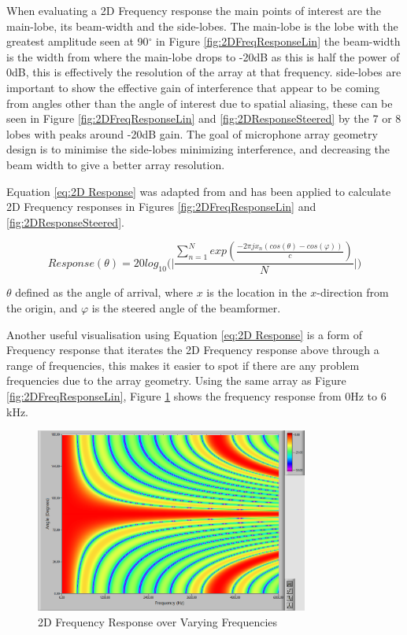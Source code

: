 \documentclass{UoNMCHA}
\numberwithin{equation}{section}
\begin{document}
    When evaluating a 2D Frequency response the main points of interest are the main-lobe, its beam-width and the side-lobes. The main-lobe is the lobe with the greatest amplitude seen at 90$^{\circ}$ in Figure \ref{fig:2DFreqResponseLin} the beam-width is the width from where the main-lobe drops to -20dB as this is half the power of 0dB, this is effectively the resolution of the array at that frequency. side-lobes are important to show the effective gain of interference that appear to be coming from angles other than the angle of interest due to spatial aliasing, these can be seen in Figure \ref{fig:2DFreqResponseLin} and \ref{fig:2DResponseSteered} by the 7 or 8 lobes with peaks around -20dB gain. The goal of microphone array geometry design is to minimise the side-lobes minimizing interference, and decreasing the beam width to give a better array resolution.
    
    Equation \ref{eq:2D Response} was adapted from \citet{Ben08} and has been applied to calculate 2D Frequency responses in Figures \ref{fig:2DFreqResponseLin} and \ref{fig:2DResponseSteered}.
    
    \begin{equation}
        Response(\theta) = 20log_{10} \Big( \Big|\frac{\sum_{n=1}^N exp(\frac{-2\pi jx_n(cos(\theta)-cos(\varphi))}{c})}{N}\Big| \Big)
        \label{eq:2D Response}
    \end{equation}
    
    $\theta$ defined as the angle of arrival, where $x$ is the location in the $x$-direction from the origin, and $\varphi$ is the steered angle of the beamformer.
    
    Another useful visualisation using Equation \ref{eq:2D Response} is a form of Frequency response that iterates the 2D Frequency response above through a range of frequencies, this makes it easier to spot if there are any problem frequencies due to the array geometry. Using the same array as Figure \ref{fig:2DFreqResponseLin}, Figure \ref{fig:2DVaryFreqResp} shows the frequency response from $0$Hz to $6$kHz.
    
    \begin{figure}[H]
        \centering
        \includegraphics[keepaspectratio, width = 0.8\textwidth]{Figures/2DVaryFreqResp.png}
        \caption{2D Frequency Response over Varying Frequencies}
        \label{fig:2DVaryFreqResp}
    \end{figure}
    
\end{document}

